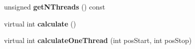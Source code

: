 \begin{DoxyCompactItemize}
\item 
unsigned {\bfseries get\+N\+Threads} () const \hypertarget{class_ox_1_1_image_calculator_a906f63b246304fecee3bd713eea0730b}{}\label{class_ox_1_1_image_calculator_a906f63b246304fecee3bd713eea0730b}

\item 
virtual int {\bfseries calculate} ()\hypertarget{class_ox_1_1_image_calculator_a078ed4a5fec8b0237154a676312f496d}{}\label{class_ox_1_1_image_calculator_a078ed4a5fec8b0237154a676312f496d}

\item 
virtual int {\bfseries calculate\+One\+Thread} (int pos\+Start, int pos\+Stop)\hypertarget{class_ox_1_1_image_calculator_a94a64117277c46dd286cdf8eeffe75e2}{}\label{class_ox_1_1_image_calculator_a94a64117277c46dd286cdf8eeffe75e2}

\end{DoxyCompactItemize}
